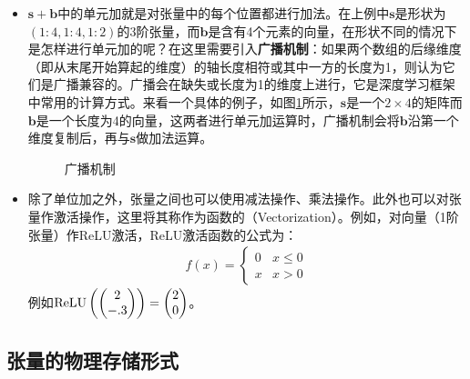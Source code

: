 \begin{itemize}
\vspace{0.5em}
\item $ \mathbf s+\mathbf b $中的单元加就是对张量中的每个位置都进行加法。在上例中$ \mathbf s $是形状为$ (1:4,1:4,1:2) $的3阶张量，而$ \mathbf b $是含有4个元素的向量，在形状不同的情况下是怎样进行单元加的呢？在这里需要引入{\small\sffamily\bfseries{广播机制}}：如果两个数组的后缘维度（即从末尾开始算起的维度）的轴长度相符或其中一方的长度为1，则认为它们是广播兼容的。广播会在缺失或长度为1的维度上进行，它是深度学习框架中常用的计算方式。来看一个具体的例子，如图\ref{fig:5-28}所示，$ \mathbf s $是一个$ 2\times 4 $的矩阵而$ \mathbf b $是一个长度为4的向量，这两者进行单元加运算时，广播机制会将$ \mathbf b $沿第一个维度复制后，再与$ \mathbf s $做加法运算。

\begin{figure}[htp]
\centering

\caption{广播机制}
\label{fig:5-28}
\end {figure}
\vspace{0.5em}
\item 除了单位加之外，张量之间也可以使用减法操作、乘法操作。此外也可以对张量作激活操作，这里将其称作为函数的{\small{}}（Vectorization）。例如，对向量（1阶张量）作ReLU激活，ReLU激活函数的公式为：
\begin{eqnarray}
f(x)=\begin{cases} 0 & x\le 0 \\x & x>0\end{cases}
\label{eq:5-26}
\end{eqnarray}
\vspace{-0.5em}
例如$ {\rm{ReLU}}\left( \begin{pmatrix} 2\\-.3\end{pmatrix}\right)=\begin{pmatrix} 2\\0\end{pmatrix} $。
\vspace{0.5em}
\end{itemize}


\subsection{张量的物理存储形式}

